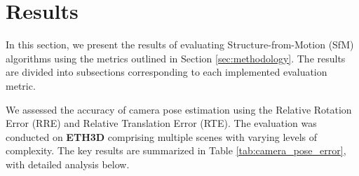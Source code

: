 \section{Results}\label{sec:results}

In this section, we present the results of evaluating Structure-from-Motion (SfM) algorithms using the metrics outlined in Section \ref{sec:methodology}. 
The results are divided into subsections corresponding to each implemented evaluation metric.

We assessed the accuracy of camera pose estimation using the Relative Rotation Error (RRE) and Relative Translation Error (RTE). 
The evaluation was conducted on \textbf{ETH3D} comprising multiple scenes with varying levels of complexity. 
The key results are summarized in Table \ref{tab:camera_pose_error}, with detailed analysis below.



